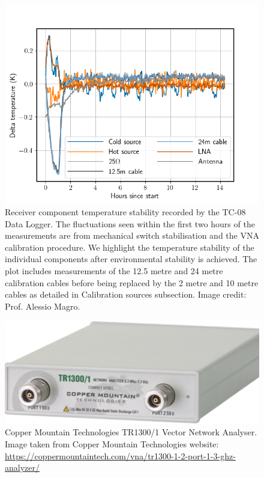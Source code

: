 \begin{figure}
    \centering
    \includegraphics[scale=0.6]{temperature}
    \caption{Receiver component temperature stability recorded by the TC-08 Data Logger. The fluctuations seen within the first two hours of the measurements are from mechanical switch stabilisation and the VNA calibration procedure. We highlight the temperature stability of the individual components after environmental stability is achieved. The plot includes measurements of the 12.5 metre and 24 metre calibration cables before being replaced by the 2 metre and 10 metre cables as detailed in Calibration sources subsection. Image credit: Prof. Alessio Magro.}
    \label{fig:temperature}
\end{figure}
\clearpage
\begin{figure}[t]
    \centering
    \includegraphics[scale=0.5]{vna}
    \caption{Copper Mountain Technologies TR1300/1 Vector Network Analyser. Image taken from Copper Mountain Technologies website: \url{https://coppermountaintech.com/vna/tr1300-1-2-port-1-3-ghz-analyzer/}}
    \label{fig:vna}
\end{figure}
